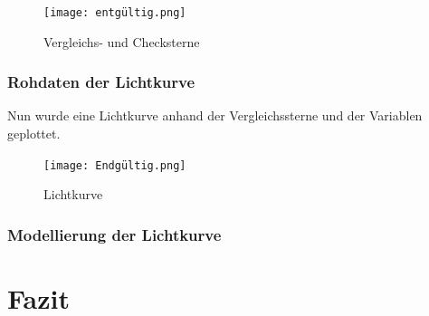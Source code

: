 \documentclass[ngerman,ruledheaders=section,class=report,thesis={type=Protokoll},accentcolor=1b,marginpar=false,parskip=half-,fontsize=11pt,]{tudapub}
\begin{document}
	\begin{figure}[h]
		\centering
		\texttt{[image: entgültig.png]}
		\caption{Vergleichs- und Checksterne}
		\label{Abbildung 4.43}
	\end{figure}
	
	
	
	\subsection{Rohdaten der Lichtkurve}
	Nun wurde eine Lichtkurve anhand der Vergleichssterne und der Variablen geplottet. 
	
	\begin{figure}[h]
		\centering
		\texttt{[image: Endgültig.png]}
		\caption{Lichtkurve}
		\label{Abbildung 4.44}
	\end{figure}
	
	\subsection{Modellierung der Lichtkurve}
	
	\chapter{Fazit}
	
	
	
	\printbibliography
	
	
\end{document}

